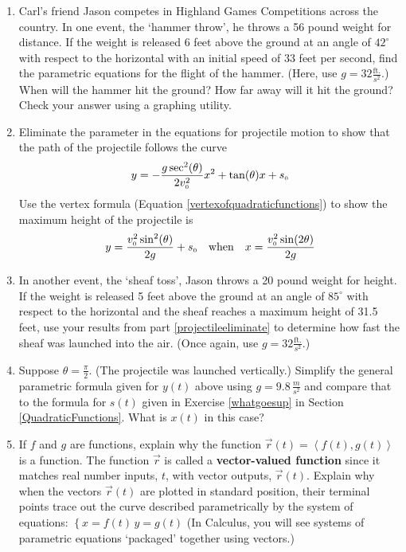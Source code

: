\documentclass{ximera}
\begin{document}
\begin{enumerate}
\setcounter{enumi}{\value{HW}}

\item  Carl's friend Jason competes in Highland Games Competitions across the country.  In one event, the `hammer throw',  he throws a 56 pound weight for distance. If the weight is released $6$ feet above the ground at an angle of $42^{\circ}$ with respect to the horizontal with an initial speed of $33$ feet per second, find the parametric equations for the flight of the hammer.  (Here, use $g = 32 \frac{\text{ft.}}{s^2}$.) When will the hammer hit the ground?  How far away will it hit the ground? Check your answer using a graphing utility.

\item  \label{projectileeliminate} Eliminate the parameter in the equations for projectile motion to show that the path of the projectile follows the curve \[y = -\dfrac{g \sec^{2}(\theta)}{2 v_{\text{\tiny$0$}}^2} x^2 + \tan(\theta) x + s_{\text{\tiny $0$}}\] Use the vertex formula (Equation \ref{vertexofquadraticfunctions}) to show the maximum height of the projectile is \[y = \dfrac{v_{\text{\tiny$0$}}^2 \sin^{2}(\theta)}{2g} + s_{\text{\tiny $0$}} \quad \text{when} \quad x = \dfrac{v_{\text{\tiny$0$}}^2 \sin(2\theta) }{2g}\] 

\item  In another event, the `sheaf toss', Jason throws a  20 pound weight for height.  If the weight is released  5 feet above the ground at an angle of $85^{\circ}$ with respect to the horizontal and the sheaf reaches a maximum height of 31.5 feet, use your results from part  \ref{projectileeliminate} to determine how fast the sheaf was launched into the air.  (Once again, use $g = 32 \frac{\text{ft.}}{s^2}$.)

\item  Suppose $\theta = \frac{\pi}{2}$. (The projectile was launched vertically.) Simplify the general parametric formula given for $y(t)$ above using  $g = 9.8 \, \frac{m}{s^2}$ and compare that to the formula for $s(t)$ given in Exercise \ref{whatgoesup} in Section \ref{QuadraticFunctions}.  What is $x(t)$ in this case?

\item  If $f$ and $g$ are functions, explain why the function $\vec{r}(t) = \left<f(t), g(t) \right>$ is a function. The function $\vec{r}$ is called a \textbf{vector-valued function} since it matches real number inputs, $t$, with vector outputs, $\vec{r}(t)$.   Explain why when the vectors  $\vec{r}(t)$ are plotted in standard position, their terminal points trace out the curve described parametrically by the system of equations:  $\left\{ x = f(t) \, y =  g(t) \right.$  (In Calculus, you will see  systems of parametric equations `packaged' together using vectors.)

\setcounter{HW}{\value{enumi}}
\end{enumerate}
\end{document}
